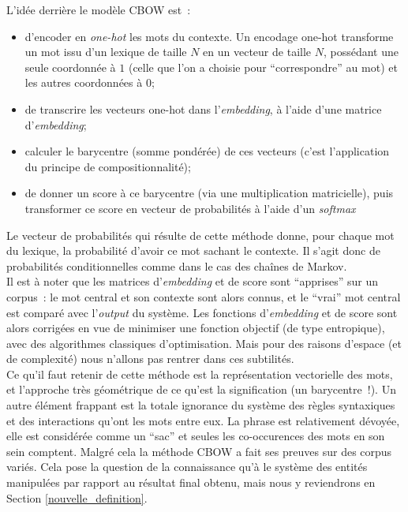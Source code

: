 \documentclass{article}
\begin{document}
				L'idée derrière le modèle CBOW est~:
				\vspace{2mm}
				\begin{itemize}
					\item d'encoder en \textit{one-hot} les mots du contexte. Un encodage one-hot transforme un mot issu d'un lexique de taille $N$ en un vecteur de taille $N$, possédant une seule coordonnée à $1$ (celle que l'on a choisie pour ``correspondre'' au mot) et les autres coordonnées à $0$;
					\item de transcrire les vecteurs one-hot dans l'\textit{embedding}, à l'aide d'une matrice d'\textit{embedding};
					\item calculer le barycentre (somme pondérée) de ces vecteurs (c'est l'application du principe de compositionnalité);
					\item de donner un score à ce barycentre (via une multiplication matricielle), puis transformer ce score en vecteur de probabilités à l'aide d'un \textit{softmax}
				\end{itemize}
				\vspace{2mm}
				Le vecteur de probabilités qui résulte de cette méthode donne, pour chaque mot du lexique, la probabilité d'avoir ce mot sachant le contexte. Il s'agit donc de probabilités conditionnelles comme dans le cas des chaînes de Markov.\\
				
				Il est à noter que les matrices d'\textit{embedding} et de score sont ``apprises'' sur un corpus~: le mot central et son contexte sont alors connus, et le ``vrai'' mot central est comparé avec l'\textit{output} du système. Les fonctions d'\textit{embedding} et de score sont alors corrigées en vue de minimiser une fonction objectif (de type entropique), avec des algorithmes classiques d'optimisation. Mais pour des raisons d'espace (et de complexité) nous n'allons pas rentrer dans ces subtilités. \\
				
				Ce qu'il faut retenir de cette méthode est la représentation vectorielle des mots, et l'approche très géométrique de ce qu'est la signification (un barycentre~!). Un autre élément frappant est la totale ignorance du système des règles syntaxiques et des interactions qu'ont les mots entre eux. La phrase est relativement dévoyée, elle est considérée comme un ``sac'' et seules les co-occurences des mots en son sein comptent. Malgré cela la méthode CBOW a fait ses preuves sur des corpus variés. Cela pose la question de la connaissance qu'à le système des entités manipulées par rapport au résultat final obtenu, mais nous y reviendrons en Section \ref{nouvelle_definition}.
\end{document}
